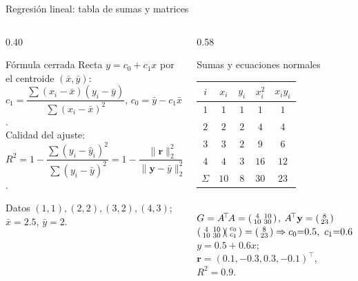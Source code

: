 \documentclass[aspectratio=169,10pt]{beamer}
\begin{document}
\begin{frame}{Regresión lineal: tabla de sumas y matrices}
\begin{columns}[T]
\begin{column}{0.40\textwidth}
\begin{cardidea}{Fórmula cerrada}{\faSuperscript}
{\footnotesize Recta $y=c_0+c_1x$ por el centroide $(\bar x,\bar y)$:\\[0.6mm]
$c_1=\dfrac{\sum(x_i-\bar x)(y_i-\bar y)}{\sum(x_i-\bar x)^2}$, \; $c_0=\bar y-c_1\bar x$.\\[1.4mm]
Calidad del ajuste:\\[0.2mm]
$R^2=1-\dfrac{\sum(y_i-\hat y_i)^2}{\sum(y_i-\bar y)^2}=1-\dfrac{\|\mathbf r\|_2^2}{\|\mathbf y-\bar y\|_2^2}$.}
\end{cardidea}
\vspace{1mm}
\begin{cardnota}[\faListOl]
{\footnotesize Datos $(1,1),(2,2),(3,2),(4,3)$; $\bar x=2.5$, $\bar y=2$.}
\end{cardnota}
\end{column}
\begin{column}{0.58\textwidth}
\begin{cardgear}{Sumas y ecuaciones normales}{\faTable}
\centering
{\footnotesize\renewcommand{\arraystretch}{1.12}\setlength{\tabcolsep}{5pt}
\begin{tabular}{c|cccc}
$i$ & $x_i$ & $y_i$ & $x_i^2$ & $x_iy_i$\\\hline
$1$&$1$&$1$&$1$&$1$\\
$2$&$2$&$2$&$4$&$4$\\
$3$&$3$&$2$&$9$&$6$\\
$4$&$4$&$3$&$16$&$12$\\\hline
$\Sigma$&$10$&$8$&$30$&$23$\\
\end{tabular}}\\[1.4mm]
{\footnotesize $G=A^{\!\top}\!A=\begin{psmallmatrix}4&10\\ 10&30\end{psmallmatrix}$,\;
$A^{\!\top}\mathbf y=\begin{psmallmatrix}8\\ 23\end{psmallmatrix}$\\[1.2mm]
$\begin{psmallmatrix}4&10\\ 10&30\end{psmallmatrix}\!\begin{psmallmatrix}c_0\\ c_1\end{psmallmatrix}=\begin{psmallmatrix}8\\ 23\end{psmallmatrix}\Rightarrow c_0{=}0.5,\ c_1{=}0.6$\\[1.0mm]
$y=0.5+0.6x$; $\mathbf r=(0.1,-0.3,0.3,-0.1)^{\!\top}$, $R^2=0.9$.}
\end{cardgear}
\end{column}
\end{columns}
\end{frame}
\end{document}
